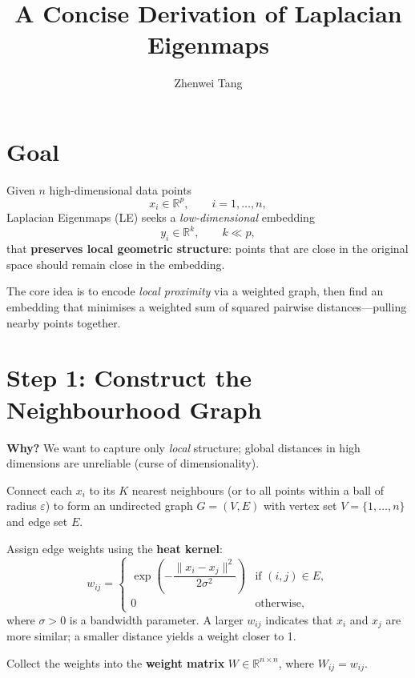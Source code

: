 \documentclass[11pt]{article}
\begin{document}
\title{A Concise Derivation of Laplacian Eigenmaps}
\author{Zhenwei Tang}
\date{}
\maketitle

\section*{Goal}

Given $n$ high-dimensional data points
\[
  x_i \in \mathbb{R}^p, \qquad i = 1, \dots, n,
\]
Laplacian Eigenmaps (LE) seeks a \emph{low-dimensional} embedding
\[
  y_i \in \mathbb{R}^k, \qquad k \ll p,
\]
that \textbf{preserves local geometric structure}: points that are
close in the original space should remain close in the embedding.

The core idea is to encode \emph{local proximity} via a weighted
graph, then find an embedding that minimises a weighted sum of
squared pairwise distances---pulling nearby points together.

\section*{Step 1: Construct the Neighbourhood Graph}

\textbf{Why?} We want to capture only \emph{local} structure; global
distances in high dimensions are unreliable (curse of dimensionality).

Connect each $x_i$ to its $K$ nearest neighbours (or to all points
within a ball of radius $\varepsilon$) to form an undirected graph
$G = (V, E)$ with vertex set $V = \{1, \dots, n\}$ and edge set $E$.

Assign edge weights using the \textbf{heat kernel}:
\[
  w_{ij} =
  \begin{cases}
    \exp\!\left(-\dfrac{\|x_i - x_j\|^2}{2\sigma^2}\right) & \text{if } (i,j)\in E,\\[6pt]
    0 & \text{otherwise,}
  \end{cases}
\]
where $\sigma > 0$ is a bandwidth parameter.  A larger $w_{ij}$
indicates that $x_i$ and $x_j$ are more similar; a smaller distance
yields a weight closer to 1.

Collect the weights into the \textbf{weight matrix}
$W \in \mathbb{R}^{n \times n}$, where $W_{ij} = w_{ij}$.
\end{document}
